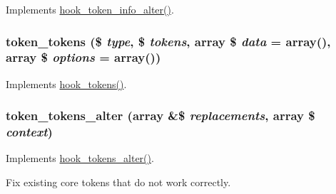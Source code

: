 \label{token_8tokens_8inc_ad634dc57d9d19bb21135a670ef40e95f}
Implements \hyperlink{group__hooks_ga87392434688c9f52c4066de4ab9d73a8}{hook\_\-token\_\-info\_\-alter()}. \hypertarget{token_8tokens_8inc_a2de5011f4dbf53434a231c973af2b73d}{
\subsubsection[{token\_\-tokens}]{\setlength{\rightskip}{0pt plus 5cm}token\_\-tokens (\$ {\em type}, \/  \$ {\em tokens}, \/  array \$ {\em data} = {\ttfamily array()}, \/  array \$ {\em options} = {\ttfamily array()})}}
\label{token_8tokens_8inc_a2de5011f4dbf53434a231c973af2b73d}
Implements \hyperlink{group__hooks_ga3bfd87d9a19b2397b0f970e1cff7ea4f}{hook\_\-tokens()}. \hypertarget{token_8tokens_8inc_ac238d7743df5e0b29418569a4aa88ab9}{
\subsubsection[{token\_\-tokens\_\-alter}]{\setlength{\rightskip}{0pt plus 5cm}token\_\-tokens\_\-alter (array \&\$ {\em replacements}, \/  array \$ {\em context})}}
\label{token_8tokens_8inc_ac238d7743df5e0b29418569a4aa88ab9}
Implements \hyperlink{group__hooks_gaeeea438e74b29e5603f0ed3f1967a257}{hook\_\-tokens\_\-alter()}.

Fix existing core tokens that do not work correctly. 